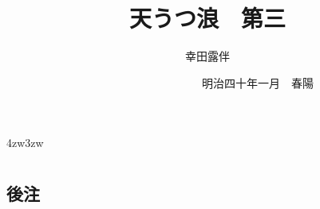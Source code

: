 \documentclass[
uplatex                                     ,%
dvipdfmx                                    ,%
book                                        ,%
tate                                        ,%
twoside                                     ,%
paper                       = a5paper       ,%
open_bracket_pos            = nibu_tentsuki ,%
hanging_punctuation                         ,%
openany                                     ,%
jafontsize                  = 12pt          ,%
]{jlreq}
\title{\Huge 天うつ浪　{\Large 第三}}
\author{幸田露伴}
\date{　　　　　　　　　{\small 明治四十年一月}　春陽{\換字{堂}}}
\begin{document}
\maketitle
\pagestyle{myheadings}
\newcommand{\Entry}[1]{
	\section*{#1}
	\markboth{#1}{#1}
	\setcounter{equation}{0}}
\begin{indentation}{4zw}{3zw}
\parindent=0pt

\chapter*{}



















































\end{indentation}

\newpage
\section*{後注}
\theendnotes
\end{document}
